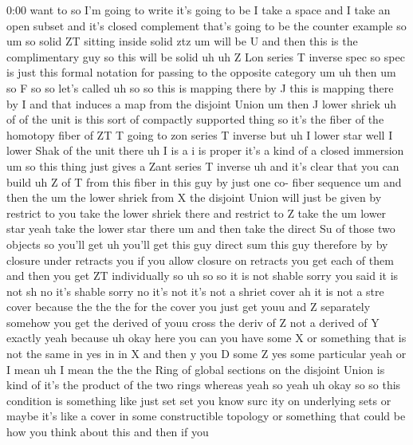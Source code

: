 \begin{unfinished}{0:00}
want  to  so  I'm  going  to  write  it's  going
to  be  I  take  a  space  and  I  take  an  open
subset  and  it's  closed  complement  that's
going  to  be  the  counter  example  so  um  so
solid  ZT  sitting  inside  solid
ztz  um  will  be  U  and  then  this  is  the
complimentary  guy  so  this  will  be
solid
uh  uh  Z  Lon  series  T
inverse
spec  so  spec  is  just  this  formal
notation  for  passing  to  the  opposite
category  um
uh  then
um  so  F  so  so  let's  called  uh  so  so  this
is  mapping  there  by  J  this  is  mapping
there  by  I  and  that  induces  a  map  from
the  disjoint  Union  um  then  J  lower
shriek  uh  of  of  the
unit  is  this  sort  of  compactly  supported
thing  so  it's  the  fiber  of  the  homotopy
fiber  of  ZT  T  going  to  zon  series  T
inverse  but  uh  I  lower  star  well  I  lower
Shak  of  the  unit
there  uh  I  is  a  i  is  proper  it's  a  kind
of  a  closed  immersion  um  so  this  thing
just  gives  a  Zant  series  T
inverse  uh  and  it's  clear  that  you  can
build  uh  Z  of  T  from  this  fiber  in  this
guy  by  just  one  co-  fiber  sequence
um  and  then  the  um  the  lower  shriek  from
X  the  disjoint  Union  will  just  be  given
by  restrict  to  you  take  the  lower  shriek
there  and  restrict  to  Z  take  the  um
lower  star  yeah  take  the  lower  star
there  um  and  then  take  the  direct  Su  of
those  two  objects  so  you'll
get  uh  you'll  get  this  guy  direct  sum
this  guy  therefore  by  by  closure  under
retracts  you  if  you  allow  closure  on
retracts  you  get  each  of  them  and  then
you  get  ZT  individually  so
uh  so  so  it  is  not
shable  sorry  you  said  it  is  not  sh  no
it's  shable  sorry  no  it's  not  it's  not  a
shriet
cover  ah  it  is  not  a  stre  cover  because
the  the  the  for  the  cover  you  just  get
youu  and  Z  separately  somehow  you  get
the  derived  of  youu  cross  the  deriv  of  Z
not  a  derived  of  Y  exactly  yeah  because
uh  okay  here  you  can  you  have  some  X  or
something  that  is  not  the  same  in  yes  in
in  X  and  then  y  you  D  some  Z  yes  some
particular  yeah  or  I  mean  uh  I  mean  the
the  the  Ring  of  global  sections  on  the
disjoint  Union  is  kind  of  it's  the
product  of  the  two  rings  whereas  yeah  so
yeah  uh  okay  so  so  this  condition  is
something  like  just  set  set  you  know
surc  ity  on  underlying  sets  or  maybe
it's  like  a  cover  in  some  constructible
topology  or  something  that  could  be  how
you  think  about  this  and  then  if  you

\end{unfinished}

